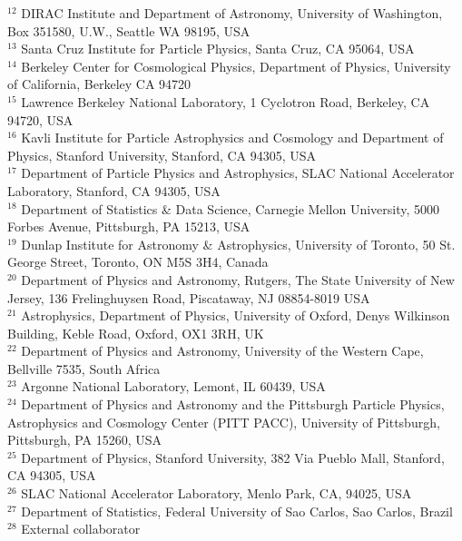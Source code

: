 {{$^{12}$ DIRAC Institute and Department of Astronomy, University of Washington, Box 351580, U.W., Seattle WA 98195, USA\\
$^{13}$ Santa Cruz Institute for Particle Physics, Santa Cruz, CA 95064, USA\\
$^{14}$ Berkeley Center for Cosmological Physics, Department of Physics, University of California, Berkeley CA 94720\\
$^{15}$ Lawrence Berkeley National Laboratory, 1 Cyclotron Road, Berkeley, CA 94720, USA\\
$^{16}$ Kavli Institute for Particle Astrophysics and Cosmology and Department of Physics, Stanford University, Stanford, CA 94305, USA\\
$^{17}$ Department of Particle Physics and Astrophysics, SLAC National Accelerator Laboratory, Stanford, CA 94305, USA\\
$^{18}$ Department of Statistics \& Data Science, Carnegie Mellon University, 5000 Forbes Avenue, Pittsburgh, PA 15213, USA\\
$^{19}$ Dunlap Institute for Astronomy \& Astrophysics, University of Toronto, 50 St. George Street, Toronto, ON M5S 3H4, Canada\\
$^{20}$ Department of Physics and Astronomy, Rutgers, The State University of New Jersey, 136 Frelinghuysen Road, Piscataway, NJ 08854-8019 USA\\
$^{21}$ Astrophysics, Department of Physics, University of Oxford, Denys Wilkinson Building, Keble Road, Oxford, OX1 3RH, UK\\
$^{22}$ Department of Physics and Astronomy, University of the Western Cape, Bellville 7535, South Africa\\
$^{23}$ Argonne National Laboratory, Lemont, IL 60439, USA\\
$^{24}$ Department of Physics and Astronomy and the Pittsburgh Particle Physics, Astrophysics and Cosmology Center (PITT PACC), University of Pittsburgh, Pittsburgh, PA 15260, USA\\
$^{25}$ Department of Physics, Stanford University, 382 Via Pueblo Mall, Stanford, CA 94305, USA\\
$^{26}$ SLAC National Accelerator Laboratory, Menlo Park, CA, 94025, USA\\
$^{27}$ Department of Statistics, Federal University of Sao Carlos, Sao Carlos, Brazil\\
$^{28}$ External collaborator\\
}
}
